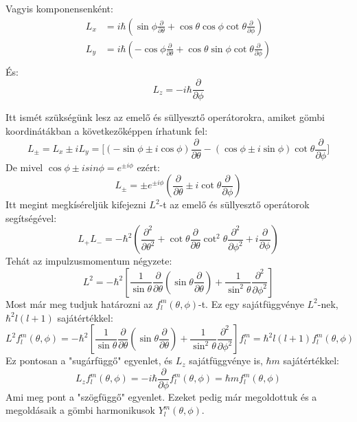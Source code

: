 \documentclass[../main.tex]{subfiles}
\begin{document}
Vagyis komponensenként:
\begin{equation}
    \begin{aligned}
        L_x &= i \hbar \left( \sin \phi \frac{\partial}{\partial \theta} + \cos \theta \cos \phi \cot \theta \frac{\partial}{\partial \phi} \right) \\
        L_y &= i \hbar \left( - \cos \phi \frac{\partial}{\partial \theta} + \cos \theta \sin \phi \cot \theta \frac{\partial}{\partial \phi} \right) \\
    \end{aligned}
\end{equation}
És:
\begin{equation}
    \boxed{L_z = - i \hbar \frac{\partial}{\partial \phi}}
\end{equation}

Itt ismét szükségünk lesz az emelő és süllyesztő operátorokra, amiket gömbi koordinátákban a következőképpen írhatunk fel:
\begin{equation}
    L_\pm = L_x \pm i L_y = \bigg [ (- \sin \phi \pm i \cos \phi) \frac{\partial}{\partial \theta} - (\cos \phi \pm i \sin \phi) \cot \theta \frac{\partial}{\partial \phi} \bigg]
\end{equation}
De mivel $\cos \phi \pm i sin \phi = e^{\pm i \phi}$ ezért:
\begin{equation}
    L_\pm = \pm e^{\pm i \phi} \left( \frac{\partial}{\partial \theta} \pm i \cot \theta \frac{\partial}{\partial \phi} \right)
\end{equation}
Itt megint megkíséreljük kifejezni $L^2$-t az emelő és süllyesztő operátorok segítségével:
\begin{equation}
    L_+ L_- = - \hbar^2 \left(\frac{\partial^2}{\partial \theta^2} + \cot \theta \frac{\partial}{\partial \theta} \cot^2 \theta \frac{\partial^2}{\partial \phi^2} + i \frac{\partial}{\partial \phi} \right)
\end{equation}
Tehát az impulzusmomentum négyzete:
\begin{equation}
    \boxed{L^2 = - \hbar^2 \left[ \frac{1}{\sin \theta} \frac{\partial}{\partial \theta} \left( \sin \theta \frac{\partial}{\partial \theta} \right) + \frac{1}{\sin^2 \theta} \frac{\partial^2}{\partial \phi^2} \right]}
\end{equation}
Most már meg tudjuk határozni az $f_l^m (\theta, \phi)$-t. Ez egy sajátfüggvénye $L^2$-nek, $\hbar^2 l (l + 1)$ sajátértékkel:
\begin{equation}
    L^2 f_l^m (\theta, \phi) = -\hbar^2 \left[ \frac{1}{\sin \theta} \frac{\partial}{\partial \theta} \left( \sin \theta \frac{\partial}{\partial \theta} \right) + \frac{1}{\sin^2 \theta} \frac{\partial^2}{\partial \phi^2} \right] f_l^m = \hbar^2 l (l + 1) f_l^m (\theta, \phi)
\end{equation}
Ez pontosan a "sugárfüggő" egyenlet, és $L_z$ sajátfüggvénye is, $\hbar m$ sajátértékkel:
\begin{equation}
    L_z f_l^m (\theta, \phi) = - i \hbar \frac{\partial}{\partial \phi} f_l^m (\theta, \phi) = \hbar m f_l^m (\theta, \phi)
\end{equation}
Ami meg pont a "szögfüggő" egyenlet. Ezeket pedig már megoldottuk és a megoldásaik a gömbi harmonikusok $Y_l^m (\theta, \phi)$. 
\end{document}
